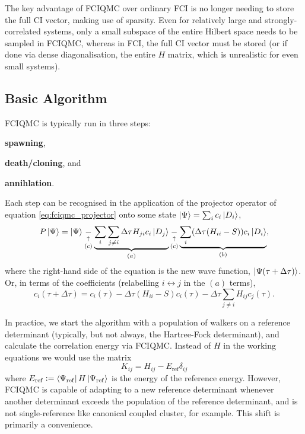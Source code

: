 The key advantage of \gls{FCIQMC} over ordinary \gls{FCI} is no longer needing to store the full \gls{CI} vector, making use of sparsity. Even for relatively large and strongly-correlated systems, only a small subspace of the entire Hilbert space needs to be sampled in FCIQMC, whereas in FCI, the full CI vector must be stored (or if done via dense diagonalisation, the entire $H$ matrix, which is unrealistic for even small systems).

\subsection{Basic Algorithm}

\gls{FCIQMC} is typically run in three steps:
\begin{enumerate*}[label=(\alph*), itemjoin={\hspace{1em}}]
    \item \textbf{spawning},
    \item \textbf{death/cloning}, and
    \item \textbf{annihlation}.
\end{enumerate*}
Each step can be recognised in the application of the projector operator of equation \ref{eq:fciqmc_projector} onto some state
$\ket\Psi = \sum_i c_i\ket{D_i}$,
\begin{equation}
    P\ket\Psi = \ket\Psi \underset{(c)}{\underset{\uparrow}{-}} \underbrace{\sum_{i}\sum_{j\neq i}\Delta\tau H_{ji}c_i\ket{D_j}}_{(a)} \underset{(c)}{\underset{\uparrow}{-}} \underbrace{\sum_i (\Delta\tau(H_{ii}-S))c_i\ket{D_i}}_{(b)},
\end{equation}
where the right-hand side of the equation is the new wave function, $\ket{\Psi(\tau+\Delta\tau)}$. Or, in terms of the coefficients (relabelling $i\leftrightarrow j$ in the $(a)$ terms),
\begin{equation}
    c_i(\tau+\Delta\tau) = c_i(\tau) - \Delta\tau(H_{ii}-S)c_i(\tau) - \Delta\tau\sum_{j\neq i}H_{ij}c_j(\tau).
\end{equation}

In practice, we start the algorithm with a population of walkers on a reference determinant (typically, but not always, the Hartree-Fock determinant), and calculate the correlation energy via FCIQMC. Instead of $H$ in the working equations we would use the matrix
\begin{equation}
    K_{ij} = H_{ij} - E_\mathrm{ref}\delta_{ij}
\end{equation}
where $E_\mathrm{ref}\mathrel{\mathop:}=\bra{\Psi_\mathrm{ref}}H\ket{\Psi_\mathrm{ref}}$ is the energy of the reference energy. However, FCIQMC is capable of adapting to a new reference determinant whenever another determinant exceeds the population of the reference determinant, and is not single-reference like canonical coupled cluster, for example. This shift is primarily a convenience.

